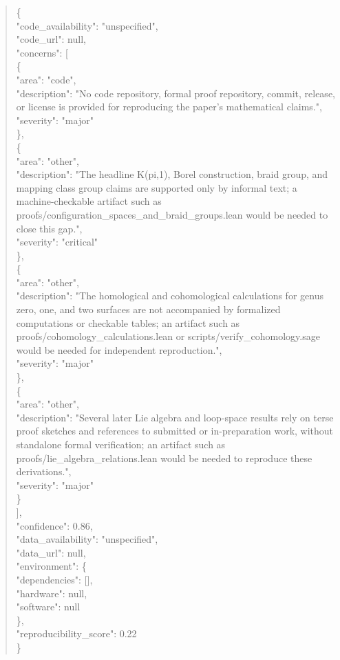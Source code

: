 \documentclass[11pt]{article}
\begin{document}
\begin{quote}\small\ttfamily\raggedright
\{\\
  "code\_availability": "unspecified",\\
  "code\_url": null,\\
  "concerns": [\\
    \{\\
      "area": "code",\\
      "description": "No code repository, formal proof repository, commit, release, or license is provided for reproducing the paper's mathematical claims.",\\
      "severity": "major"\\
    \},\\
    \{\\
      "area": "other",\\
      "description": "The headline K(pi,1), Borel construction, braid group, and mapping class group claims are supported only by informal text; a machine-checkable artifact such as proofs/configuration\_spaces\_and\_braid\_groups.lean would be needed to close this gap.",\\
      "severity": "critical"\\
    \},\\
    \{\\
      "area": "other",\\
      "description": "The homological and cohomological calculations for genus zero, one, and two surfaces are not accompanied by formalized computations or checkable tables; an artifact such as proofs/cohomology\_calculations.lean or scripts/verify\_cohomology.sage would be needed for independent reproduction.",\\
      "severity": "major"\\
    \},\\
    \{\\
      "area": "other",\\
      "description": "Several later Lie algebra and loop-space results rely on terse proof sketches and references to submitted or in-preparation work, without standalone formal verification; an artifact such as proofs/lie\_algebra\_relations.lean would be needed to reproduce these derivations.",\\
      "severity": "major"\\
    \}\\
  ],\\
  "confidence": 0.86,\\
  "data\_availability": "unspecified",\\
  "data\_url": null,\\
  "environment": \{\\
    "dependencies": [],\\
    "hardware": null,\\
    "software": null\\
  \},\\
  "reproducibility\_score": 0.22\\
\}\\
\end{quote}
\end{document}
